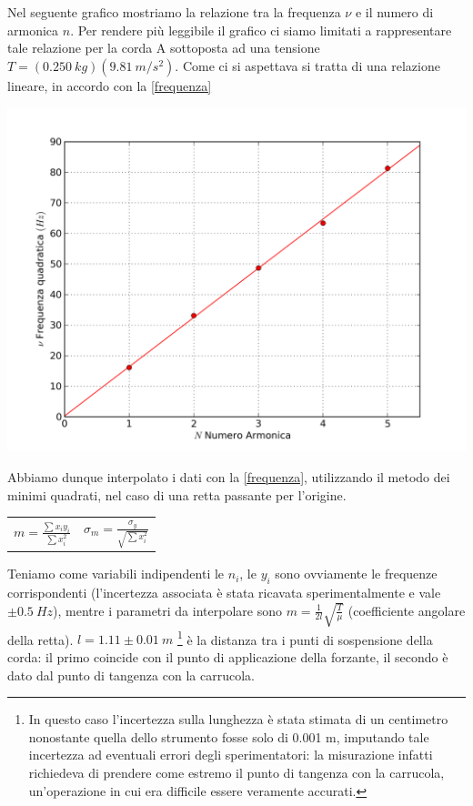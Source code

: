 Nel seguente grafico mostriamo la relazione tra la frequenza $\nu$ e il numero di armonica $n$. 
Per rendere più leggibile il grafico ci siamo limitati a rappresentare tale relazione per la corda A sottoposta ad una tensione $T=(0.250\ kg)(9.81\ m/s^2)$. Come ci si aspettava si tratta di una relazione lineare, in accordo con la \ref{frequenza}


\begin{center}

\includegraphics[scale=0.70]{../grafici/corda_1armonica}
\end{center}

Abbiamo dunque interpolato i dati con la \ref{frequenza}, utilizzando il metodo dei minimi quadrati, nel caso di una retta passante per l'origine.

\begin{center}
\begin{tabular}{c c}
$m=\frac{\displaystyle\sum{x_i y_i}}{\displaystyle\sum{x_i^2}}$ & \hspace{2cm} $\sigma_m=\frac{\displaystyle\sigma_y}{\sqrt{\displaystyle\sum{x_i^2}}}$
\end{tabular}
\end{center}

Teniamo come variabili indipendenti le $n_i$, le $y_i$ sono ovviamente le frequenze corrispondenti (l'incertezza associata è stata ricavata sperimentalmente e vale $\pm0.5\ Hz$), mentre i parametri da interpolare sono $m=\frac{1}{2l}\sqrt{\frac{T}{\mu}}$ (coefficiente angolare della retta).
$l=1.11\pm0.01\ m$ \footnote{In questo caso l'incertezza sulla lunghezza è stata stimata di un centimetro nonostante quella dello strumento fosse solo di 0.001 m, imputando tale incertezza ad eventuali errori degli sperimentatori: la misurazione infatti richiedeva di prendere come estremo il punto di tangenza con la carrucola, un'operazione in cui era difficile essere veramente accurati.}
è la distanza tra i punti di sospensione della corda: il primo coincide con il punto di applicazione della forzante, il secondo è dato dal punto di tangenza con la carrucola.  

